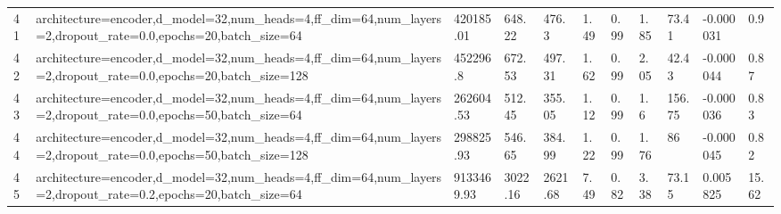 \begin{longtable}{C{0.8cm} L{2cm} C{1.15cm} C{1.15cm} C{1.15cm} C{1.15cm} C{0.85cm} C{1.25cm} C{1.2cm} C{1.5cm} C{1.0cm}}
41 & architecture=encoder,\newline d\_model=32,\newline num\_heads=4,\newline ff\_dim=64,\newline num\_layers=2,\newline dropout\_rate=0.0,\newline epochs=20,\newline batch\_size=64 & 420185.01 & 648.22 & 476.3 & 1.49 & 0.99 & 1.85 & 73.41 & -0.000031 & 0.9 \\
42 & architecture=encoder,\newline d\_model=32,\newline num\_heads=4,\newline ff\_dim=64,\newline num\_layers=2,\newline dropout\_rate=0.0,\newline epochs=20,\newline batch\_size=128 & 452296.8 & 672.53 & 497.31 & 1.62 & 0.99 & 2.05 & 42.43 & -0.000044 & 0.87 \\
43 & architecture=encoder,\newline d\_model=32,\newline num\_heads=4,\newline ff\_dim=64,\newline num\_layers=2,\newline dropout\_rate=0.0,\newline epochs=50,\newline batch\_size=64 & 262604.53 & 512.45 & 355.05 & 1.12 & 0.99 & 1.6 & 156.75 & -0.000036 & 0.83 \\
44 & architecture=encoder,\newline d\_model=32,\newline num\_heads=4,\newline ff\_dim=64,\newline num\_layers=2,\newline dropout\_rate=0.0,\newline epochs=50,\newline batch\_size=128 & 298825.93 & 546.65 & 384.99 & 1.22 & 0.99 & 1.76 & 86 & -0.000045 & 0.82 \\
45 & architecture=encoder,\newline d\_model=32,\newline num\_heads=4,\newline ff\_dim=64,\newline num\_layers=2,\newline dropout\_rate=0.2,\newline epochs=20,\newline batch\_size=64 & 9133469.93 & 3022.16 & 2621.68 & 7.49 & 0.82 & 3.38 & 73.15 & 0.005825 & 15.62 \\

\end{longtable}
